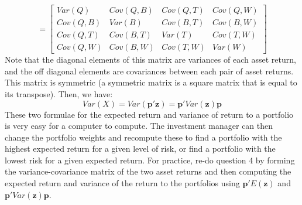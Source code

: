 \documentclass[12pt]{report}
\begin{document}
{$$=
\begin{bmatrix}
Var(Q) & Cov(Q,B) & Cov(Q,T) & Cov(Q,W) \\
Cov(Q,B) & Var(B) & Cov(B,T) & Cov(B,W) \\
Cov(Q,T) & Cov(B,T) & Var(T) & Cov(T,W) \\
Cov(Q,W) & Cov(B,W) & Cov(T,W) & Var(W)
\end{bmatrix}$$ Note that the diagonal elements of this matrix are variances of each asset return, and the off diagonal elements are covariances between each pair of asset returns. This matrix is symmetric (a symmetric matrix is a square matrix that is equal to its transpose). Then, we have: $$Var(X) = Var(\textbf{p}'\textbf{z}) = \textbf{p}'Var(\textbf{z})\textbf{p}$$ These two formulae for the expected return and variance of return to a portfolio is very easy for a computer to compute. The investment manager can then change the portfolio weights and recompute these to find a portfolio with the highest expected return for a given level of risk, or find a portfolio with the lowest risk for a given expected return. For practice, re-do question 4 by forming the variance-covariance matrix of the two asset returns and then computing the expected return and variance of the return to the portfolios using $\textbf{p}'E(\textbf{z})$ and $\textbf{p}'Var(\textbf{z})\textbf{p}$.}
\end{document}
